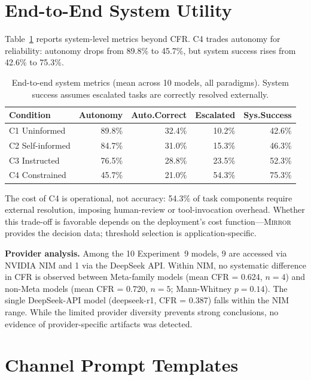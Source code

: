 \documentclass[10pt]{article}
\newcommand{\mirror}{\textsc{Mirror}}
\begin{document}
\section{End-to-End System Utility}
\label{app:e2e}

Table~\ref{tab:e2e} reports system-level metrics beyond CFR. C4 trades autonomy for reliability: autonomy drops from 89.8\% to 45.7\%, but system success rises from 42.6\% to 75.3\%.

\begin{table}[h]
\centering
\caption{End-to-end system metrics (mean across 10 models, all paradigms). System success assumes escalated tasks are correctly resolved externally.}
\label{tab:e2e}
\small
\begin{tabular}{lrrrr}
\toprule
Condition & Autonomy & Auto.Correct & Escalated & Sys.Success \\
\midrule
C1 Uninformed & 89.8\% & 32.4\% & 10.2\% & 42.6\% \\
C2 Self-informed & 84.7\% & 31.0\% & 15.3\% & 46.3\% \\
C3 Instructed & 76.5\% & 28.8\% & 23.5\% & 52.3\% \\
C4 Constrained & 45.7\% & 21.0\% & 54.3\% & 75.3\% \\
\bottomrule
\end{tabular}
\end{table}

The cost of C4 is operational, not accuracy: 54.3\% of task components require external resolution, imposing human-review or tool-invocation overhead. Whether this trade-off is favorable depends on the deployment's cost function---\mirror{} provides the decision data; threshold selection is application-specific.

\textbf{Provider analysis.} Among the 10 Experiment~9 models, 9 are accessed via NVIDIA NIM and 1 via the DeepSeek API. Within NIM, no systematic difference in CFR is observed between Meta-family models (mean CFR = 0.624, $n=4$) and non-Meta models (mean CFR = 0.720, $n=5$; Mann-Whitney $p = 0.14$). The single DeepSeek-API model (deepseek-r1, CFR = 0.387) falls within the NIM range. While the limited provider diversity prevents strong conclusions, no evidence of provider-specific artifacts was detected.

\section{Channel Prompt Templates}
\label{app:prompts-full}
\end{document}
